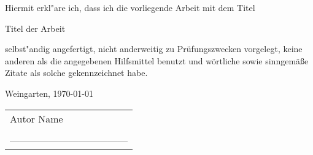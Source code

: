 
\thispagestyle{empty} %

Hiermit erkl"are ich, dass ich die vorliegende Arbeit mit dem Titel \newline    %
\begin{center}
{\LARGE{Titel der Arbeit}}
\end{center}
selbst"andig angefertigt, nicht anderweitig zu Prüfungszwecken vorgelegt, keine anderen als die angegebenen Hilfsmittel benutzt und wörtliche sowie sinngemäße Zitate als solche gekennzeichnet habe.\newline  %

\begin{flushleft}
Weingarten, \today %
\end{flushleft}

\begin{tabular}{l}   
Autor Name        \\%
 \\
------------------------------------ \\
\end{tabular}




